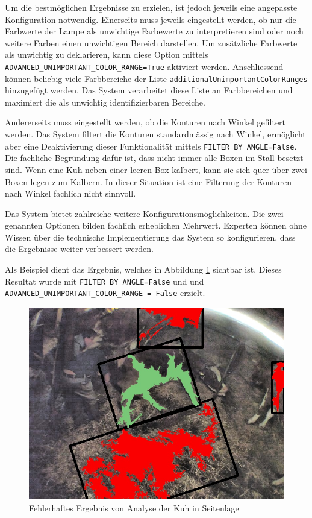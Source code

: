 Um die bestmöglichen Ergebnisse zu erzielen, ist jedoch jeweils eine angepasste Konfiguration notwendig.
Einerseits muss jeweils eingestellt werden, ob nur die Farbwerte der Lampe als unwichtige Farbewerte zu interpretieren sind oder noch weitere Farben einen unwichtigen Bereich darstellen. Um zusätzliche Farbwerte als unwichtig zu deklarieren, kann diese Option mittels \texttt{ADVANCED_UNIMPORTANT_COLOR_RANGE=True} aktiviert werden. Anschliessend können beliebig viele Farbbereiche der Liste \texttt{additionalUnimportantColorRanges} hinzugefügt werden. Das System verarbeitet diese Liste an Farbbereichen und maximiert die als unwichtig identifizierbaren Bereiche.

Andererseits muss eingestellt werden, ob die Konturen nach Winkel gefiltert werden. Das System filtert die Konturen standardmässig nach Winkel, ermöglicht aber eine Deaktivierung dieser Funktionalität mittels \texttt{FILTER_BY_ANGLE=False}. Die fachliche Begründung dafür ist, dass nicht immer alle Boxen im Stall besetzt sind. Wenn eine Kuh neben einer leeren Box kalbert, kann sie sich quer über zwei Boxen legen zum Kalbern. In dieser Situation ist eine Filterung der Konturen nach Winkel fachlich nicht sinnvoll.

Das System bietet zahlreiche weitere Konfigurationsmöglichkeiten. Die zwei genannten Optionen bilden fachlich  erheblichen Mehrwert. Experten können ohne Wissen über die technische Implementierung das System so konfigurieren, dass die Ergebnisse weiter verbessert werden. 

Als Beispiel dient das Ergebnis, welches in Abbildung \ref{fig: Fehlerhaftes Ergebnis von Analyse der Kuh in Seitenlage} sichtbar ist. Dieses Resultat wurde mit \texttt{FILTER_BY_ANGLE=False} und und \texttt{ADVANCED_UNIMPORTANT_COLOR_RANGE = False} erzielt. 
\begin{figure}[H]
	\center
	\includegraphics[scale=0.5]{Grafiken/resultate/resultatFehlerhaft.jpg}
	\caption{Fehlerhaftes Ergebnis von Analyse der Kuh in Seitenlage} 
	\label{fig: Fehlerhaftes Ergebnis von Analyse der Kuh in Seitenlage} 
\end{figure}

